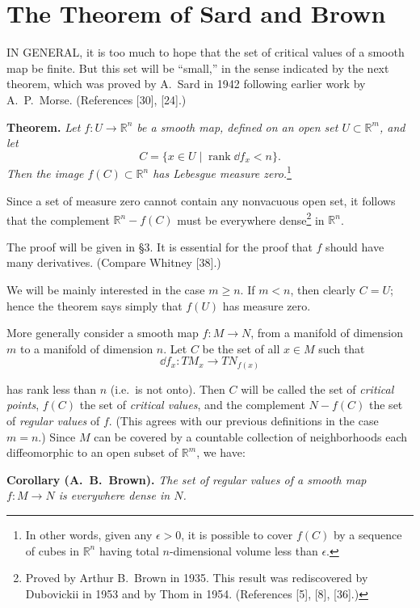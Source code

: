 
\section{The Theorem of Sard and Brown}
\label{sec:sard}

IN GENERAL, it is too much to hope that the set of critical values of a smooth map be finite. But this set will be ``small,'' in the sense indicated by the next theorem, which was proved by A.~Sard in 1942 following earlier work by A.~P.~Morse. (References [30], [24].)

\noindent\textbf{Theorem.} \textit{Let $f : U \to \mathbb{R}^n$ be a smooth map, defined on an open set $U \subset \mathbb{R}^m$, and let}
\[
C = \{x \in U \mid \operatorname{rank} \dd f_x < n\}.
\]
\textit{Then the image $f(C) \subset \mathbb{R}^n$ has Lebesgue measure zero.}\footnote{In other words, given any $\epsilon > 0$, it is possible to cover $f(C)$ by a sequence of cubes in $\mathbb{R}^n$ having total $n$-dimensional volume less than $\epsilon$.}

Since a set of measure zero cannot contain any nonvacuous open set, it follows that the complement $\mathbb{R}^n - f(C)$ must be everywhere dense\footnote{Proved by Arthur B.~Brown in 1935. This result was rediscovered by Dubovickii in 1953 and by Thom in 1954. (References [5], [8], [36].)} in $\mathbb{R}^n$.

The proof will be given in \S3. It is essential for the proof that $f$ should have many derivatives. (Compare Whitney [38].)

We will be mainly interested in the case $m \geq n$. If $m < n$, then clearly $C = U$; hence the theorem says simply that $f(U)$ has measure zero.

More generally consider a smooth map $f : M \to N$, from a manifold of dimension $m$ to a manifold of dimension $n$. Let $C$ be the set of all $x \in M$ such that
\[
\dd f_x : TM_x \to TN_{f(x)}
\]



has rank less than $n$ (i.e.\ is not onto). Then $C$ will be called the set of \emph{critical points}, $f(C)$ the set of \emph{critical values}, and the complement $N - f(C)$ the set of \emph{regular values} of $f$. (This agrees with our previous definitions in the case $m = n$.) Since $M$ can be covered by a countable collection of neighborhoods each diffeomorphic to an open subset of $\mathbb{R}^m$, we have:

\noindent\textbf{Corollary (A.~B.~Brown).} \textit{The set of regular values of a smooth map $f : M \to N$ is everywhere dense in $N$.}

